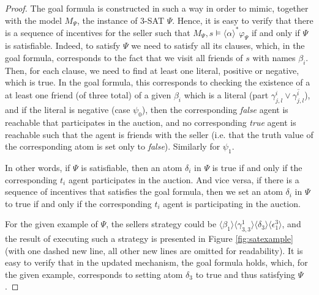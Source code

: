 \begin{proof}
The goal formula is constructed in such a way in order to mimic, together with the model $M_\Psi$, the instance of 3-SAT $\Psi$. Hence, it is easy to verify that there is a sequence of incentives for the seller such that $M_\Psi, s \models \langle \alpha \rangle^\ast \varphi_\Psi$ if and only if $\Psi$ is satisfiable. Indeed, to satisfy $\Psi$ we need to satisfy all its clauses, which, in the goal formula, corresponds to the fact that we visit all friends of $s$ with names $\beta_i$. Then, for each clause, we need to find at least one literal, positive or negative, which is true. In the goal formula, this corresponds to checking the existence of a at least one friend (of three total) of a given $\beta_i$ which is a literal (part $\gamma^i_{j,l} \lor \overline{\gamma^i_{j,l}}$), and if the literal is negative (case $\psi_0$), then the corresponding \textit{false} agent is reachable that participates in the auction, and no corresponding \textit{true} agent is reachable such that the agent is friends with the seller (i.e. that the truth value of the corresponding atom is set only to \textit{false}). Similarly for $\psi_1$. 

In other words, if $\Psi$ is satisfiable, then an atom $\delta_i$ in $\Psi$ is true if and only if the corresponding $t_i$ agent participates in the auction. And vice versa, if there is a sequence of incentives that satisfies the goal formula, then we set an atom $\delta_i$ in $\Psi$ to true if and only if the corresponding $t_i$ agent is participating in the auction.  

For the given example of $\Psi$, the sellers strategy could be $\langle \beta_1\rangle \langle \gamma^1_{3,3} \rangle \langle \delta_3 \rangle \langle \epsilon_1^3 \rangle$, and the result of executing such a strategy is presented in Figure \ref{fig:satexample} (with one dashed new line, all other new lines are omitted for readability). It is easy to verify that in the updated mechanism, the goal formula holds, which, for the given example, corresponds to setting atom $\delta_3$ to true and thus satisfying $\Psi$.
\end{proof}

